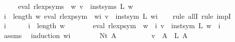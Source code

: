 \begin{isabellebody}
\ \ \ \ \ {\isachardoublequoteopen}eval\ {\isacharparenleft}{\kern0pt}rlexp{\isacharunderscore}{\kern0pt}syms\ {\isasymgamma}{\isacharprime}{\kern0pt}\ w{\isacharparenright}{\kern0pt}\ v\ {\isacharequal}{\kern0pt}\ inst{\isacharunderscore}{\kern0pt}syms\ L\ w{\isachardoublequoteclose}\isanewline
%
\isadelimproof
%
\endisadelimproof
%
\isatagproof
{}\isamarkupfalse%
\ {\isacharminus}{\kern0pt}\isanewline
\ \ \isamarkupfalse%
\ {\isachardoublequoteopen}{\isasymforall}i\ {\isacharless}{\kern0pt}\ length\ w{\isachardot}{\kern0pt}\ eval\ {\isacharparenleft}{\kern0pt}rlexp{\isacharunderscore}{\kern0pt}sym\ {\isasymgamma}{\isacharprime}{\kern0pt}\ {\isacharparenleft}{\kern0pt}w{\isacharbang}{\kern0pt}i{\isacharparenright}{\kern0pt}{\isacharparenright}{\kern0pt}\ v\ {\isacharequal}{\kern0pt}\ inst{\isacharunderscore}{\kern0pt}sym\ L\ {\isacharparenleft}{\kern0pt}w{\isacharbang}{\kern0pt}i{\isacharparenright}{\kern0pt}{\isachardoublequoteclose}\isanewline
\ \ \isamarkupfalse%
\ {\isacharparenleft}{\kern0pt}rule\ allI{\isacharcomma}{\kern0pt}\ rule\ impI{\isacharparenright}{\kern0pt}\isanewline
\ \ \ \ \isamarkupfalse%
\ i\isanewline
\ \ \ \ \isamarkupfalse%
\ {\isachardoublequoteopen}i\ {\isacharless}{\kern0pt}\ length\ w{\isachardoublequoteclose}\isanewline
\ \ \ \ \isamarkupfalse%
\ \isamarkupfalse%
\ {\isachardoublequoteopen}eval\ {\isacharparenleft}{\kern0pt}rlexp{\isacharunderscore}{\kern0pt}sym\ {\isasymgamma}{\isacharprime}{\kern0pt}\ {\isacharparenleft}{\kern0pt}w\ {\isacharbang}{\kern0pt}\ i{\isacharparenright}{\kern0pt}{\isacharparenright}{\kern0pt}\ v\ {\isacharequal}{\kern0pt}\ inst{\isacharunderscore}{\kern0pt}sym\ L\ {\isacharparenleft}{\kern0pt}w\ {\isacharbang}{\kern0pt}\ i{\isacharparenright}{\kern0pt}{\isachardoublequoteclose}\isanewline
\ \ \ \ \ \ \isamarkupfalse%
\ assms\ \isamarkupfalse%
\ {\isacharparenleft}{\kern0pt}induction\ {\isachardoublequoteopen}w{\isacharbang}{\kern0pt}i{\isachardoublequoteclose}{\isacharparenright}{\kern0pt}\isanewline
\ \ \ \ \ \ \isamarkupfalse%
\ {\isacharparenleft}{\kern0pt}Nt\ A{\isacharparenright}{\kern0pt}\isanewline
\ \ \ \ \ \ \isamarkupfalse%
\ \isamarkupfalse%
\ {\isachardoublequoteopen}v\ {\isacharparenleft}{\kern0pt}{\isasymgamma}{\isacharprime}{\kern0pt}\ A{\isacharparenright}{\kern0pt}\ {\isacharequal}{\kern0pt}\ L\ A{\isachardoublequoteclose}\ \isamarkupfalse%

\end{isabellebody}
